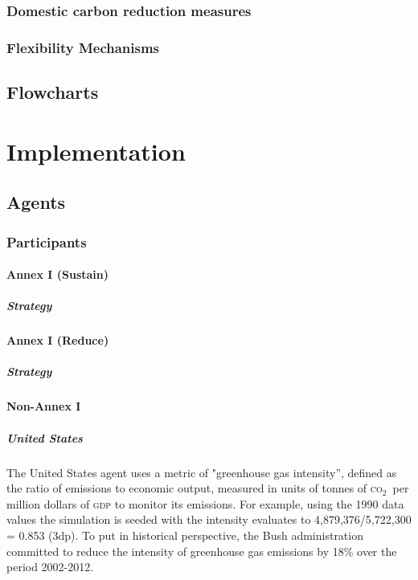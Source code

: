 \documentclass[]{article} %
\newcommand{\CO}{\textsc{co}$_2$~}
\begin{document}
\subsubsection{Domestic carbon reduction measures}

\subsubsection{Flexibility Mechanisms}

\subsection{Flowcharts}

\section{Implementation}

\subsection{Agents}

\subsubsection{Participants}

\paragraph{Annex I (Sustain)}

\subparagraph{Strategy}

\paragraph{Annex I (Reduce)}

\subparagraph{Strategy}

\paragraph{Non-Annex I}

\subparagraph{United States}

The United States agent uses a metric of "greenhouse gas intensity”, defined as the ratio of emissions to economic output, measured in units of tonnes of \CO per million dollars of \textsc{gdp} to monitor its emissions. For example, using the 1990 data values the simulation is seeded with the intensity evaluates to 4,879,376/5,722,300 = 0.853 (3dp). To put in historical perspective, the Bush administration committed to reduce the intensity of greenhouse gas emissions by 18\% over the period 2002-2012.
\end{document}
